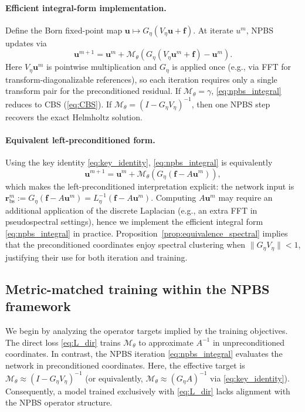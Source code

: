 \documentclass{article}
\theoremstyle{plain}
\theoremstyle{remark}
\begin{document}
\paragraph{Efficient integral-form implementation.}
\label{par:efficient_integral}
Define the Born fixed-point map $\bm u \mapsto G_\eta(V_\eta \bm u + \bm f)$.
At iterate $u^m$, NPBS updates via
\begin{equation}
\bm u^{m+1}
=
\bm u^m + \mathcal{M}_\theta\!\left(G_\eta(V_\eta \bm u^m + \bm f)-\bm u^m\right).
\label{eq:npbs_integral}
\end{equation}
Here $V_\eta \bm u^m$ is pointwise multiplication and $G_\eta$ is applied once (e.g., via FFT for transform-diagonalizable references), so each iteration requires only a single transform pair for the preconditioned residual.
If $\mathcal{M}_\theta=\gamma$, \eqref{eq:npbs_integral} reduces to CBS (\eqref{eq:CBS}).
If $\mathcal{M}_\theta = (I-G_\eta V_\eta)^{-1}$, then one NPBS step recovers the exact Helmholtz solution.

\paragraph{Equivalent left-preconditioned form.}
Using the key identity \eqref{eq:key_identity}, \eqref{eq:npbs_integral} is equivalently
\begin{equation}
\bm u^{m+1}=\bm u^m+\mathcal{M}_\theta\!\left(G_\eta(\bm f-A\bm u^m)\right),
\label{eq:npbs_iter}
\end{equation}
which makes the left-preconditioned interpretation explicit: the network input is
$\bm r_{\mathrm{bs}}^m := G_\eta(\bm f-A\bm u^m)=L_\eta^{-1}(\bm f-A\bm u^m)$.
Computing $A\bm u^m$ may require an additional application of the discrete Laplacian (e.g., an extra FFT in pseudospectral settings), hence we implement the efficient integral form \eqref{eq:npbs_integral} in practice. Proposition~\ref{prop:equivalence_spectral} implies that the preconditioned coordinates enjoy spectral clustering when $\|G_\eta V_\eta\|<1$, justifying their use for both iteration and training.

\subsection{Metric-matched training within the NPBS framework}
\label{sec:bs_loss}

We begin by analyzing the operator targets implied by the training objectives. The direct loss \eqref{eq:L_dir} trains $\mathcal{M}_\theta$ to approximate $A^{-1}$ in unpreconditioned coordinates. In contrast, the NPBS iteration \eqref{eq:npbs_integral} evaluates the network in preconditioned coordinates. Here, the effective target is $\mathcal{M}_\theta\approx (I-G_\eta V_\eta)^{-1}$ (or equivalently, $\mathcal{M}_\theta\approx (G_\eta A)^{-1}$ via \eqref{eq:key_identity}). Consequently, a model trained exclusively with \eqref{eq:L_dir} lacks alignment with the NPBS operator structure.
\end{document}
